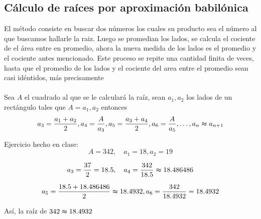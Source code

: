 \subsection{Cálculo de raíces por aproximación babilónica}
El método consiste en buscar dos números los cuales su producto sea el número al que buscamos hallarle la raiz. Luego se promedian los lados, se calcula el cociente de el área entre en promedio, ahora la nueva medida de los lados es el promedio y el cociente antes mencionado. Este proceso se repite una cantidad finita de veces, hasta que el promedio de los lados y el cociente del area entre el promedio sean casi idéntidos, más precisamente
\\\\
Sea $A$ el cuadrado al que se le calculará la raíz, sean $a_{1},a_{2}$ los lados de un rectángulo tales que $A = a_{1},a_{2}$ entonces
\begin{gather*}
    a_{3} = \frac{a_{1} + a_{2}}{2}, a_{4} = \frac{A}{a_{3}}, a_{5} = \frac{a_{3} + a_{4}}{2}, a_{6} = \frac{A}{a_{5}}, \dots , a_{n} \thickapprox a_{n+1}
\end{gather*}


Ejercicio hecho en clase:
\[
    A=342, \quad a_{1}=18, a_{2}=19
\]

\[
    a_{3} = \frac{37}{2} = 18.5, \quad a_{4} = \frac{342}{18.5} \thickapprox 18.486486
\]

\[
    a_{5} = \frac{18.5 +18.486486}{2} \thickapprox 18.4932, a_{6} = \frac{342}{18.4932} = 18.4932
\]

Así, la raíz de $342 \thickapprox 18.4932$